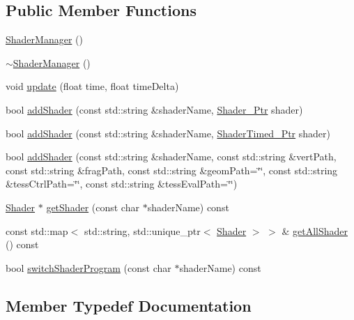 \subsection*{Public Member Functions}
\begin{DoxyCompactItemize}
\item 
\mbox{\hyperlink{classec_1_1_shader_manager_a6064ffe0b832b2744eeb83a6aef563b7}{Shader\+Manager}} ()
\item 
\mbox{\hyperlink{classec_1_1_shader_manager_afda0f442e5f6194cfd4253b9def34f0a}{$\sim$\+Shader\+Manager}} ()
\item 
void \mbox{\hyperlink{classec_1_1_shader_manager_ac5dc847819a1e8d154d8fd0280e488c1}{update}} (float time, float time\+Delta)
\item 
bool \mbox{\hyperlink{classec_1_1_shader_manager_a36bdf3a039a5a542ef4ea381ab5613ca}{add\+Shader}} (const std\+::string \&shader\+Name, \mbox{\hyperlink{classec_1_1_shader_manager_a55148a133c8ead8c61a0370dfba2d132}{Shader\+\_\+\+Ptr}} shader)
\item 
bool \mbox{\hyperlink{classec_1_1_shader_manager_a720a9aca4f9dfe076a8f3f7cde58aedf}{add\+Shader}} (const std\+::string \&shader\+Name, \mbox{\hyperlink{classec_1_1_shader_manager_a43eaaa56325923c6cb6280f83f8ca08a}{Shader\+Timed\+\_\+\+Ptr}} shader)
\item 
bool \mbox{\hyperlink{classec_1_1_shader_manager_a81a63a18679d10c93e75b11ded25e8f0}{add\+Shader}} (const std\+::string \&shader\+Name, const std\+::string \&vert\+Path, const std\+::string \&frag\+Path, const std\+::string \&geom\+Path=\char`\"{}\char`\"{}, const std\+::string \&tess\+Ctrl\+Path=\char`\"{}\char`\"{}, const std\+::string \&tess\+Eval\+Path=\char`\"{}\char`\"{})
\item 
\mbox{\hyperlink{classec_1_1_shader}{Shader}} $\ast$ \mbox{\hyperlink{classec_1_1_shader_manager_a3e1390b9c15a6809ef07a10bac4112c7}{get\+Shader}} (const char $\ast$shader\+Name) const
\item 
const std\+::map$<$ std\+::string, std\+::unique\+\_\+ptr$<$ \mbox{\hyperlink{classec_1_1_shader}{Shader}} $>$ $>$ \& \mbox{\hyperlink{classec_1_1_shader_manager_aaff28268f21b821c048f351684a0213f}{get\+All\+Shader}} () const
\item 
bool \mbox{\hyperlink{classec_1_1_shader_manager_af42171dd2256a130b056d772e3190da0}{switch\+Shader\+Program}} (const char $\ast$shader\+Name) const
\end{DoxyCompactItemize}


\subsection{Member Typedef Documentation}
\mbox{\label{classec_1_1_shader_manager_a55148a133c8ead8c61a0370dfba2d132}} 
